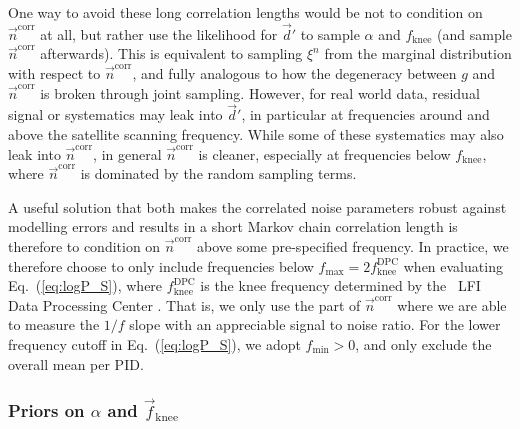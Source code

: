 \documentclass[twocolumn]{aa}
\renewcommand{\d}[0]{\vec{d}}
\newcommand{\n}[0]{\vec{n}}
\newcommand{\f}[0]{\vec{f}}
\begin{document}
One way to avoid these long correlation lengths would be not to 
condition on $\n^\mathrm{corr}$ at all, but rather use the likelihood for 
$\d'$ to sample $\alpha$ and $f_\mathrm{knee}$ (and sample 
$\n^\mathrm{corr}$ afterwards). This is equivalent to sampling $\xi^n$
from the marginal distribution with respect to $\n^{\mathrm{corr}}$,
and fully analogous to how the degeneracy between $g$ and
$\n^{\mathrm{corr}}$ is broken through joint sampling. However, 
for real world data, residual signal or
systematics may leak into $\d'$, in particular at frequencies around
and above the satellite scanning frequency. While some of these 
systematics may also leak into $\n^\mathrm{corr}$, in general 
$\n^\mathrm{corr}$ is cleaner, especially at frequencies 
below $f_\mathrm{knee}$, where $\n^\mathrm{corr}$ is dominated
by the random sampling terms. 

A useful solution that both makes the correlated noise
parameters robust against modelling errors and results in a short
Markov chain correlation length is therefore to condition on
$\n^\mathrm{corr}$ above some pre-specified frequency. In practice, we
therefore choose to only include frequencies below
$f_\mathrm{max}=2f^{\mathrm{DPC}}_{\mathrm{knee}}$ when evaluating
Eq.~(\ref{eq:logP_S}), where $f^{\mathrm{DPC}}_{\mathrm{knee}}$ is the
knee frequency determined by the \Planck\ LFI Data Processing Center
\citep[DPC,][]{planck2016-l02}. That is, we only use the part of
$\n^\mathrm{corr}$ where we are able to measure the $1/f$ slope with
an appreciable signal to noise ratio. For the lower frequency cutoff
in Eq.~(\ref{eq:logP_S}), we adopt $f_{\mathrm{min}}>0$, and only
exclude the overall mean per PID.

\subsubsection{Priors on $\alpha$ and $\f_\mathrm{knee}$}
\end{document}
